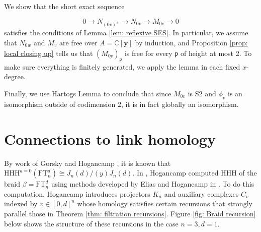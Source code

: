 \documentclass[submission]{FPSAC2027}
\newcommand{\C}{\mathbb{C}}
\newcommand{\uv}{\underline{v}}
\newcommand{\uov}{\underline{0v}}
\newcommand{\Y}{\C[\mathbf{y}]}
\newcommand{\fp}{\mathfrak{p}}
\newcommand{\HHH}{\mathrm{HHH}}
\newcommand{\FT}{\mathrm{FT}}
\begin{document}
We show that the short exact sequence

$$0 \rightarrow N_{(0v)^+} \rightarrow N_{0v} \rightarrow M_{\uov} \rightarrow 0$$
satisfies the conditions of Lemma \ref{lem: reflexive SES}. In particular, we assume that $N_{0w}$ and $M_{\uv}$ are free over $A = \Y$ by induction, and Proposition \ref{prop: local closing up} tells us that $(M_{\uov})_\fp$ is free for every $\fp$ of height at most 2. To make sure everything is finitely generated, we apply the lemma in each fixed $x$-degree.

Finally, we use Hartogs Lemma to conclude that since $M_{\uov}$ is S2 and $\phi_v$ is an isomorphism outside of codimension 2, it is in fact globally an isomorphism.
 
\section{Connections to link homology}
\label{sec: link homology}

By work of Gorsky and Hogancamp \cite{GH}, it is known that $\HHH^{a=0}(\FT_n^d) \cong J_n(d)/(y)J_n(d)$. In \cite{Hog17}, Hogancamp computed $\HHH$ of the braid $\beta = \FT_n^d$ using methods developed by Elias and Hogancamp in \cite{EH}. To do this computation, Hogancamp introduces projectors $K_n$ and auxiliary complexes $C_v$ indexed by $v \in [0,d]^n$ whose homology satisfies certain recursions that strongly parallel those in Theorem \ref{thm: filtration recursions}. Figure \ref{fig: Braid recursion} below shows the structure of these recursions in the case $n=3, d=1$.

\newcommand{\BraidStep}[3]{%
  \ifnum#1=0
    \foreach \xx in {-0.28,0,0.28}
      \draw[strand] (\xx,#2) -- (\xx,#3);
  \else
    \pgfmathsetmacro{\xl}{0.28*(#1-2)}
    \pgfmathsetmacro{\xr}{\xl+0.28}
    \pgfmathsetmacro{\yc}{0.55*(#2)+0.45*(#3)}
    \pgfmathsetmacro{\yd}{0.45*(#2)+0.55*(#3)}
    \ifnum#1=1 \def\xs{0.28}\else\def\xs{-0.28}\fi
    \draw[strand] (\xs,#2) -- (\xs,#3);
    \draw[strand] (\xr,#2)
      .. controls (\xr,\yc) and (\xl,\yd) .. (\xl,#3);
    \draw[strand,preaction={draw=white,line width=1.0pt}]
      (\xl,#2) .. controls (\xl,\yc) and (\xr,\yd) .. (\xr,#3);
  \fi
}
\end{document}
